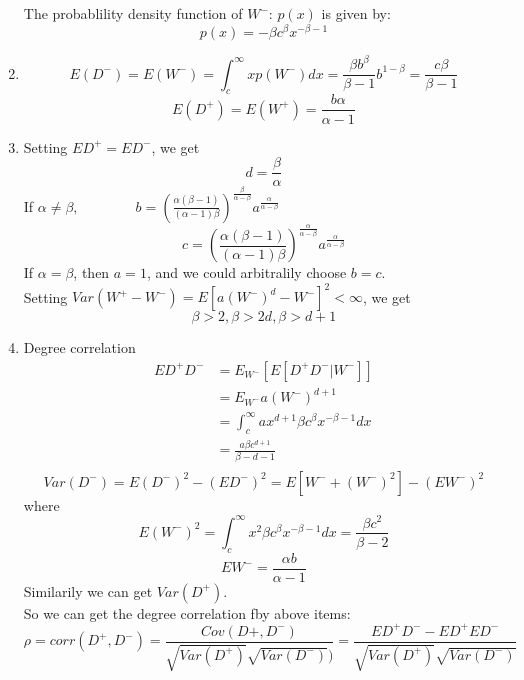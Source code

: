 \documentclass{article}
\begin{document}
\begin{enumerate}
The probablility density function of $W^-$: $p(x)$ is given by:
$$p(x) = -\beta c^{\beta} x^{-\beta - 1}$$

\item 
$$E(D^-) =E(W^-) = \int_c^\infty xp(W^-) dx = \frac{\beta b^\beta}{\beta-1}b^{1-\beta} = \frac{c\beta}{\beta - 1}$$
$$E(D^+)= E(W^+) =\frac{b\alpha}{\alpha - 1}$$

\item
Setting $ED^+ = ED^- $, we get
$$d =  \frac{\beta}{\alpha}$$
If $ \alpha \neq \beta,  \qquad \qquad b = (\frac{\alpha (\beta - 1)}{(\alpha-1)\beta})^{\frac{\beta}{\alpha - \beta} }a^{\frac{\alpha}{\alpha - \beta}}$\\
$$  c =  (\frac{\alpha (\beta - 1)}{(\alpha-1)\beta})^{\frac{\alpha}{\alpha - \beta} }a^{\frac{\alpha}{\alpha - \beta}} $$
If  $ \alpha = \beta $,  then $a = 1$,  and we could arbitralily choose $ b=c$.	\\
Setting  $Var(W^+ - W^-) = E[a(W^-)^d -W^-]^2  < \infty $,  we get
$$\beta >2, \beta >2d, \beta >d+1$$

\item Degree correlation
\begin{align*}
ED^+D^- &=E_{W^-}[E[D^+D^-|W^-]]\\
&=E_{W^-}a(W^-)^{d+1}\\
&=\int_c^\infty ax^{d+1}\beta c^\beta x^{-\beta - 1}dx\\
&= \frac{a \beta c^{d+1}}{\beta -d -1}\\
\end{align*}
$$Var(D^-) = E(D^-)^2-(ED^-)^2=E[W^-+(W^-)^2]-(EW^-)^2$$
where $$E(W^-)^2=\int_c^\infty x^2\beta c^\beta x^{-\beta - 1}dx=\frac{\beta c^2}{\beta - 2}$$
$$EW^- = \frac{\alpha b}{\alpha - 1}$$
Similarily we can get $Var(D^+)$.\\
So we can get the degree correlation fby above items:
$$\rho = corr(D^+, D^-) =\frac{Cov(D+, D^-)}{\sqrt{Var(D^+)}\sqrt{Var(D^-)})}=\frac{ED^+D^--ED^+ED^-}{\sqrt{Var(D^+)}\sqrt{Var(D^-)}}$$



\end{enumerate}
\end{document}
